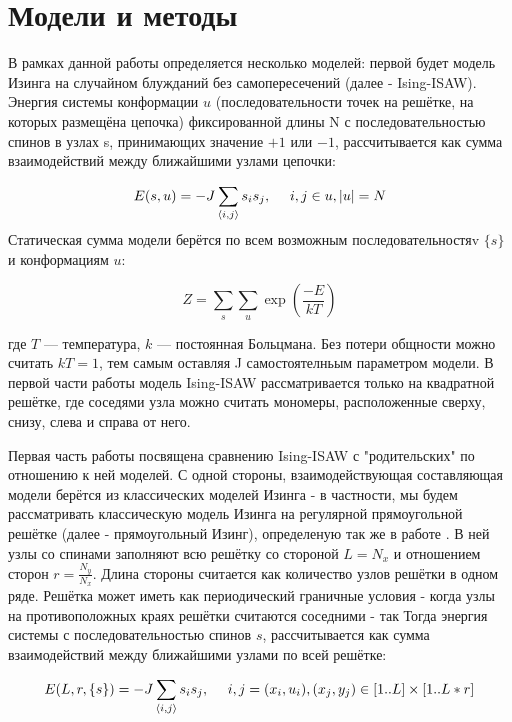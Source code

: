 \section{Модели и методы}
В рамках данной работы определяется несколько моделей: первой будет модель Изинга на случайном блужданий без самопересечений (далее - Ising-ISAW). Энергия системы конформации $u$ (последовательности точек на решётке, на которых размещёна цепочка) фиксированной длины N с последовательностью спинов в узлах s, принимающих значение $+1$ или $-1$, рассчитывается как сумма взаимодействий между ближайшими узлами цепочки:

\begin{equation}
\label{eq:IsISAW_ham}
E(s,u) = -J \sum_{\langle i, j \rangle} s_i s_j,\ \ \ \ i,j \in u, |u|=N
\end{equation}
Статическая сумма модели берётся по всем возможным последовательностяv $\{s\}$ и конформациям $u$:

\begin{equation}
Z = \sum_s \sum_u \exp{(\frac{-E}{kT})}
\end{equation}

где $T$ — температура, $k$ — постоянная Больцмана. Без потери общности можно считать $kT = 1$, тем самым оставляя J самостоятелньым параметром модели.
В первой части работы модель Ising-ISAW рассматривается только на квадратной решётке, где соседями узла можно считать мономеры, расположенные сверху, снизу, слева и справа от него.

Первая часть работы посвящена сравнению Ising-ISAW с "родительских" по отношению к ней моделей. 
С одной стороны, взаимодействующая составляющая модели берётся из классических моделей Изинга - 
в частности, мы будем рассматривать классическую модель Изинга на регулярной прямоугольной решётке (далее - прямоугольный Изинг), определеную так же в работе \cite{selke2006critical}.
В ней узлы со спинами заполняют всю решётку со стороной $L=N_x$ и отношением сторон $r=\frac{N_y}{N_x}$. Длина стороны считается как количество узлов решётки в одном ряде. 
Решётка может иметь как периодический граничные условия - когда узлы на противоположных краях решётки считаются соседними - так 
Тогда энергия системы с последовательностью спинов $s$, рассчитывается как сумма взаимодействий между ближайшими узлами по всей решётке:

\begin{equation}
E(L, r, \{s\}) = -J \sum_{\langle i, j \rangle} s_i s_j,\ \ \ \ i,j = (x_i, u_i), (x_j, y_j) \in [1..L] \times [1..L*r]
\end{equation}

